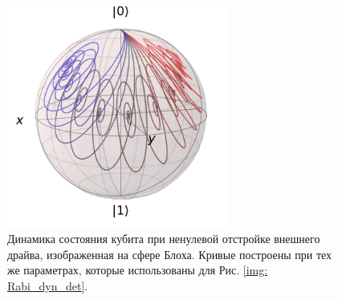 \begin{figure}[h]
	\centering
	\includegraphics[width=0.65\textwidth]{images/Bloch_rabi_det.pdf}
	\caption[Динамика состояния кубита под действием внешнего поля на сфере Блоха]{Динамика состояния кубита при ненулевой отстройке внешнего драйва, изображенная на сфере Блоха. Кривые построены при тех же параметрах, которые использованы для Рис. \ref{img: Rabi_dyn_det}.}
	\label{img: Bloch_Rabi_dyn_det}
\end{figure}

